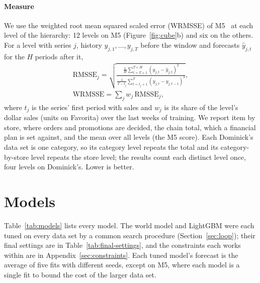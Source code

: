 \paragraph{Measure}
We use the weighted root mean squared scaled error (WRMSSE) of
M5~\cite{m5accuracy} at each level of the hierarchy: 12 levels on M5
(Figure~\ref{fig:cube}b) and six on the others. For a level with series $j$,
history $y_{j,1},\dots,y_{j,T}$ before the window and forecasts $\hat y_{j,t}$
for the $H$ periods after it,
\begin{gather}
\mathrm{RMSSE}_j = \sqrt{\frac{\tfrac1H\sum_{t=T+1}^{T+H}(y_{j,t}-\hat y_{j,t})^2}
{\tfrac{1}{T-t_j}\sum_{t=t_j+1}^{T}(y_{j,t}-y_{j,t-1})^2}},\\
\mathrm{WRMSSE} = \textstyle\sum_j w_j\,\mathrm{RMSSE}_j ,
\end{gather}
where $t_j$ is the series' first period with sales and $w_j$ is its share of the
level's dollar sales (units on Favorita) over the last weeks of training. We
report item by store, where orders and promotions are decided, the chain total,
which a financial plan is set against, and the mean over all levels (the M5
score). Each Dominick's data set is one category, so its category level repeats
the total and its category-by-store level repeats the store level; the results
count each distinct level once, four levels on Dominick's. Lower is better.

\section{Models}
\label{sec:models}

Table~\ref{tab:models} lists every model. The world model and LightGBM were
each tuned on every data set by a common search procedure (Section~\ref{sec:loop}); their
final settings are in Table~\ref{tab:final-settings}, and the constraints each
works within are in Appendix~\ref{sec:constraints}. Each tuned model's forecast
is the average of five fits with different seeds, except on M5, where each
model is a single fit to bound the cost of the larger data set.

